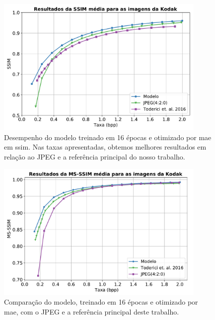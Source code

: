 \begin{figure}
	\centering
	\includegraphics[width=0.9\textwidth]{figuras/ssim_ae_jpeg_toderici.pdf}
	\caption[Curva \acrshort{ssim} por Taxa.]{Desempenho do modelo treinado em 16 épocas e otimizado por \acrshort{mae} em \acrshort{ssim}. Nas taxas apresentadas, obtemos melhores resultados em relação ao JPEG e a referência principal do nosso trabalho.}
	\label{fig:ssim_ae_jpeg_toderici}
\end{figure}	



\begin{figure}
	\centering
	\includegraphics[width=0.9\textwidth]{figuras/msssim_ae_jpeg_toderici.pdf}
	\caption[Curva \acrshort{msssim} por Taxa.]{Comparação do modelo, treinado em 16 épocas e otimizado por \acrshort{mae}, com o JPEG e a referência principal deste trabalho.}
	\label{fig:msssim_ae_jpeg_toderici}
\end{figure}	



